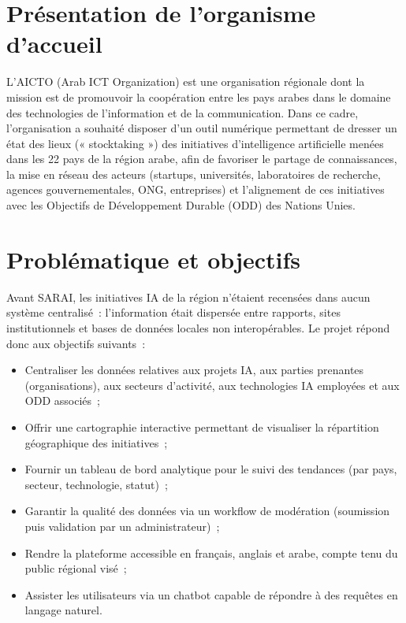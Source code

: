 \documentclass[11pt,a4paper]{report}
\begin{document}
\section{Présentation de l'organisme d'accueil}

L'AICTO (Arab ICT Organization) est une organisation régionale dont la mission est de promouvoir la
coopération entre les pays arabes dans le domaine des technologies de l'information et de la communication.
Dans ce cadre, l'organisation a souhaité disposer d'un outil numérique permettant de dresser un état des
lieux (« stocktaking ») des initiatives d'intelligence artificielle menées dans les 22 pays de la région
arabe, afin de favoriser le partage de connaissances, la mise en réseau des acteurs (startups, universités,
laboratoires de recherche, agences gouvernementales, ONG, entreprises) et l'alignement de ces initiatives
avec les Objectifs de Développement Durable (ODD) des Nations Unies.

\section{Problématique et objectifs}

Avant SARAI, les initiatives IA de la région n'étaient recensées dans aucun système centralisé~:
l'information était dispersée entre rapports, sites institutionnels et bases de données locales non
interopérables. Le projet répond donc aux objectifs suivants~:

\begin{itemize}
  \item Centraliser les données relatives aux projets IA, aux parties prenantes (organisations), aux
    secteurs d'activité, aux technologies IA employées et aux ODD associés~;
  \item Offrir une cartographie interactive permettant de visualiser la répartition géographique des
    initiatives~;
  \item Fournir un tableau de bord analytique pour le suivi des tendances (par pays, secteur, technologie,
    statut)~;
  \item Garantir la qualité des données via un workflow de modération (soumission puis validation par un
    administrateur)~;
  \item Rendre la plateforme accessible en français, anglais et arabe, compte tenu du public régional
    visé~;
  \item Assister les utilisateurs via un chatbot capable de répondre à des requêtes en langage naturel.
\end{itemize}
\end{document}
